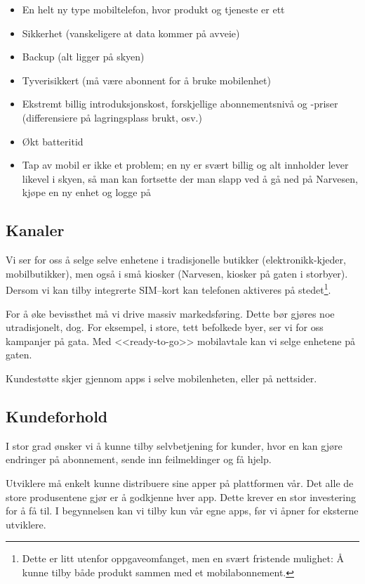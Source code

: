 \begin{itemize}
  \item En helt ny type mobiltelefon, hvor produkt og tjeneste er ett
  \item Sikkerhet (vanskeligere at data kommer på avveie)
  \item Backup (alt ligger på skyen)
  \item Tyverisikkert (må være abonnent for å bruke mobilenhet)
  \item Ekstremt billig introduksjonskost, forskjellige abonnementsnivå og
    -priser (differensiere på lagringsplass brukt, osv.)
  \item Økt batteritid
  \item Tap av mobil er ikke et problem; en ny er svært billig og alt innholder
    lever likevel i skyen, så man kan fortsette der man slapp ved å gå ned på
    Narvesen, kjøpe en ny enhet og logge på
\end{itemize}

\subsection{Kanaler}

Vi ser for oss å selge selve enhetene i tradisjonelle butikker
(elektronikk-kjeder, mobilbutikker), men også i små kiosker (Narvesen, kiosker
på gaten i storbyer). Dersom vi kan tilby integrerte SIM--kort kan telefonen
aktiveres på stedet\footnote{Dette er litt utenfor oppgaveomfanget, men en
svært fristende mulighet: Å kunne tilby både produkt sammen med et
mobilabonnement.}.

For å øke bevissthet må vi drive massiv markedsføring. Dette bør gjøres noe
utradisjonelt, dog. For eksempel, i store, tett befolkede byer, ser vi for oss
kampanjer på gata. Med <<ready-to-go>> mobilavtale kan vi selge enhetene på
gaten.

Kundestøtte skjer gjennom apps i selve mobilenheten, eller på nettsider.

\subsection{Kundeforhold}

I stor grad ønsker vi å kunne tilby selvbetjening for kunder, hvor en kan gjøre
endringer på abonnement, sende inn feilmeldinger og få hjelp.

Utviklere må enkelt kunne distribuere sine apper på plattformen vår.  Det alle
de store produsentene gjør er å godkjenne hver app. Dette krever en stor
investering for å få til.  I begynnelsen kan vi tilby kun vår egne apps, før vi
åpner for eksterne utviklere.

